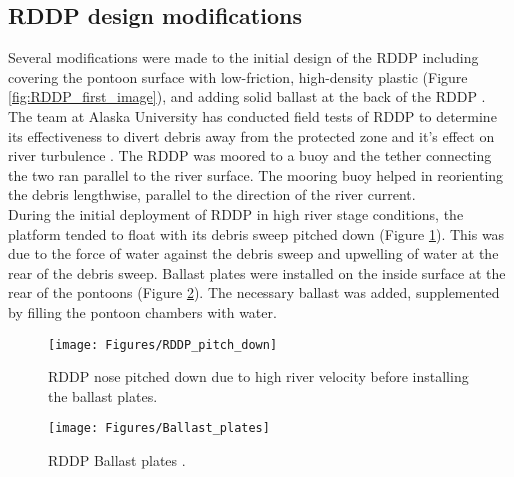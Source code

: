 \subsection{RDDP design modifications}
Several modifications were made to the initial design of the RDDP including covering the pontoon surface with low-friction, high-density plastic (Figure \ref{fig:RDDP_first_image}), and adding solid ballast at the back of the RDDP \cite{Reference7}.\\
The team at Alaska University has conducted field tests of RDDP to determine its effectiveness to divert debris away from the protected zone and it's effect on river turbulence \cite{Reference7}. The RDDP was moored to a buoy and the tether connecting the two ran parallel to the river surface. The mooring buoy helped in reorienting the debris lengthwise, parallel to the direction of the river current.\\
During the initial deployment of RDDP in high river stage conditions, the platform tended to float with its debris sweep pitched down (Figure \ref{fig:RDDP_pitch_down}). This was due to the force of water against the debris sweep and upwelling of water at the rear of the debris sweep. Ballast plates were installed on the inside surface at the rear of the pontoons (Figure \ref{fig:Ballast_plates}). The necessary ballast was added, supplemented by filling the pontoon chambers with water.\\

\begin{figure}
\centering
\texttt{[image: Figures/RDDP\_pitch\_down]}
\caption{\label{fig:RDDP_pitch_down}RDDP nose pitched down due to high river velocity before installing the ballast plates\cite{Reference6}.}
\end{figure}
\begin{figure}
\centering
\texttt{[image: Figures/Ballast\_plates]}
\caption{\label{fig:Ballast_plates}RDDP Ballast plates \cite{Reference6}.}
\end{figure}

